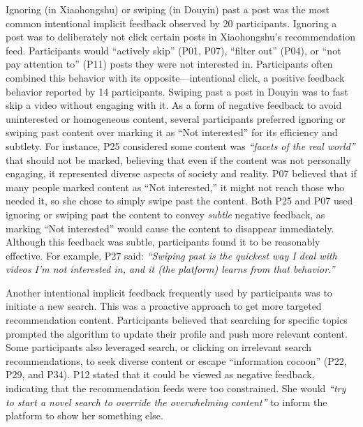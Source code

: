 Ignoring (in Xiaohongshu) or swiping (in Douyin) past a post was the most common intentional implicit feedback observed by 20 participants. Ignoring a post was to deliberately not click certain posts in Xiaohongshu's recommendation feed. Participants would ``actively skip'' (P01, P07), ``filter out'' (P04), or ``not pay attention to'' (P11) posts they were not interested in. Participants often combined this behavior with its opposite---intentional click, a positive feedback behavior reported by 14 participants. Swiping past a post in Douyin was to fast skip a video without engaging with it. As a form of negative feedback to avoid uninterested or homogeneous content, several participants preferred ignoring or swiping past content over marking it as ``Not interested'' for its efficiency and subtlety. For instance, P25 considered some content was \textit{``facets of the real world''} that should not be marked, believing that even if the content was not personally engaging, it represented diverse aspects of society and reality. P07 believed that if many people marked content as ``Not interested,'' it might not reach those who needed it, so she chose to simply swipe past the content. Both P25 and P07 used ignoring or swiping past the content to convey \textit{subtle} negative feedback, as marking ``Not interested'' would cause the content to disappear immediately. Although this feedback was subtle, participants found it to be reasonably effective. For example, P27 said: \textit{``Swiping past is the quickest way I deal with videos I'm not interested in, and it (the platform) learns from that behavior.''}

Another intentional implicit feedback frequently used by participants was to initiate a new search. This was a proactive approach to get more targeted recommendation content. Participants believed that searching for specific topics prompted the algorithm to update their profile and push more relevant content. Some participants also leveraged search, or clicking on irrelevant search recommendations, to seek diverse content or escape ``information cocoon'' (P22, P29, and P34). P12 stated that it could be viewed as negative feedback, indicating that the recommendation feeds were too constrained. She would \textit{``try to start a novel search to override the overwhelming content''} to inform the platform to show her something else.

